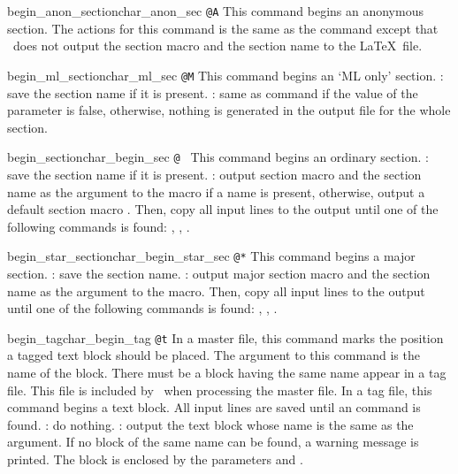 \begin{describecmd}{begin_anon_section}{char_anon_sec}{\opt}
{\verb|@A|}
\describe
This command begins an anonymous section. 
The actions for this command is the same as the 
command except that \weave\ does not output the section macro and the
section name to the \LaTeX\ file.
\end{describecmd}

\begin{describecmd}{begin_ml_section}{char_ml_sec}{\opt}
{\verb|@M|}
\describe
This command begins an `ML only' section. 
\tangleaction: save the section name if it is present.
\weaveaction: same as  command if the value of
the parameter  is false, otherwise, nothing is generated
in the output file for the whole section.
\end{describecmd}

\begin{describecmd}{begin_section}{char_begin_sec}{\opt}
{\verb*|@ |}
\describe
This command begins an ordinary section.
\tangleaction: save the section name if it is present.
\weaveaction: output  section macro  and the section
name as the argument to the macro if a name is present, otherwise,
output a default section macro . 
Then, copy all input lines to the output until one of the following
commands is found: , , .
\end{describecmd}

\begin{describecmd}{begin_star_section}{char_begin_star_sec}{\man}
{\verb|@*|}
\describe
This command begins a major section.
\tangleaction: save the section name.
\weaveaction: output major section macro  and the section
name as the argument to the macro. Then, copy all input lines to the
output until one of the following 
commands is found: , , .
\end{describecmd}

\begin{describecmd}{begin_tag}{char_begin_tag}{\man}
{\verb|@t|}
\describe
In a master file, this command marks the position a tagged text
block should be placed. The argument to this command is the name of
the block. There must be a block having the same name appear in a tag
file. This file is included by \weave\ when processing the master file.
In a tag file, this command begins a text block. All input lines are
saved until an  command is found. 
\tangleaction: do nothing.
\weaveaction:  output the text block whose name is the
same as the argument. If no block of the same name can be found, a
warning message is printed. The block is enclosed by the parameters
 and .
\end{describecmd}

